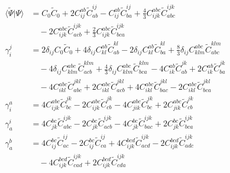 \begin{align}
\langle\widetilde\Psi\vert\Psi\rangle &= C_{0} \widetilde{C}_{0} + 2 C^{ab}_{ij} \widetilde{C}^{ij}_{ab} - C^{ab}_{ij} \widetilde{C}^{ij}_{ba} + \frac{4}{3} C^{abc}_{ijk} \widetilde{C}^{ijk}_{abc} \\
&\quad -2 C^{abc}_{ijk} \widetilde{C}^{ijk}_{acb} + \frac{2}{3} C^{abc}_{ijk} \widetilde{C}^{ijk}_{bca} \\
\gamma^{j}_{i} &= 2 \delta_{ij} C_{0} \widetilde{C}_{0} + 4 \delta_{ij} C^{ab}_{kl} \widetilde{C}^{kl}_{ab} - 2 \delta_{ij} C^{ab}_{kl} \widetilde{C}^{kl}_{ba} + \frac{8}{3} \delta_{ij} C^{abc}_{klm} \widetilde{C}^{klm}_{abc} \\
&\quad -4 \delta_{ij} C^{abc}_{klm} \widetilde{C}^{klm}_{acb} + \frac{4}{3} \delta_{ij} C^{abc}_{klm} \widetilde{C}^{klm}_{bca} - 4 C^{ab}_{ik} \widetilde{C}^{jk}_{ab} + 2 C^{ab}_{ik} \widetilde{C}^{jk}_{ba} \\
&\quad -4 C^{abc}_{ikl} \widetilde{C}^{jkl}_{abc} + 2 C^{abc}_{ikl} \widetilde{C}^{jkl}_{acb} + 4 C^{abc}_{ikl} \widetilde{C}^{jkl}_{bac} - 2 C^{abc}_{ikl} \widetilde{C}^{jkl}_{bca} \\
\gamma^{a}_{i} &= 4 C^{abc}_{ijk} \widetilde{C}^{jk}_{bc} - 2 C^{abc}_{ijk} \widetilde{C}^{jk}_{cb} - 4 C^{abc}_{jik} \widetilde{C}^{jk}_{bc} + 2 C^{abc}_{jik} \widetilde{C}^{jk}_{cb} \\
\gamma^{i}_{a} &= 4 C^{bc}_{jk} \widetilde{C}^{ijk}_{abc} - 2 C^{bc}_{jk} \widetilde{C}^{ijk}_{acb} - 4 C^{bc}_{jk} \widetilde{C}^{ijk}_{bac} + 2 C^{bc}_{jk} \widetilde{C}^{ijk}_{bca} \\
\gamma^{b}_{a} &= 4 C^{bc}_{ij} \widetilde{C}^{ij}_{ac} - 2 C^{bc}_{ij} \widetilde{C}^{ij}_{ca} + 4 C^{bcd}_{ijk} \widetilde{C}^{ijk}_{acd} - 2 C^{bcd}_{ijk} \widetilde{C}^{ijk}_{adc} \\
&\quad -4 C^{bcd}_{ijk} \widetilde{C}^{ijk}_{cad} + 2 C^{bcd}_{ijk} \widetilde{C}^{ijk}_{cda}
\end{align}
